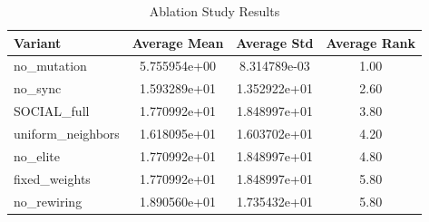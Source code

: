 \begin{table}[h]
\centering
\caption{Ablation Study Results}
\begin{tabular}{lccc}
\hline
Variant & Average Mean & Average Std & Average Rank \\
\hline
no_mutation & 5.755954e+00 & 8.314789e-03 & 1.00 \\
no_sync & 1.593289e+01 & 1.352922e+01 & 2.60 \\
SOCIAL_full & 1.770992e+01 & 1.848997e+01 & 3.80 \\
uniform_neighbors & 1.618095e+01 & 1.603702e+01 & 4.20 \\
no_elite & 1.770992e+01 & 1.848997e+01 & 4.80 \\
fixed_weights & 1.770992e+01 & 1.848997e+01 & 5.80 \\
no_rewiring & 1.890560e+01 & 1.735432e+01 & 5.80 \\
\hline
\end{tabular}
\end{table}
